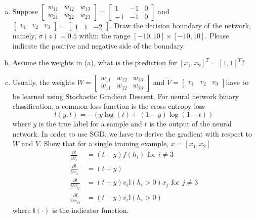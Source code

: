 \documentclass{article}
\begin{document}
    \begin{enumerate}[(a)]
        \item Suppose $\begin{bmatrix}w_{11} & w_{12} & w_{13} \\w_{21} & w_{22} & w_{23}\end{bmatrix} = \begin{bmatrix}1 & -1 & 0 \\-1 & -1 & 0\end{bmatrix}$ and $\begin{bmatrix} v_1 & v_2 & v_3\end{bmatrix} = \begin{bmatrix} 1 & 1 & -2\end{bmatrix}$. Draw the decision boundary of the network, namely, $\sigma(z) = 0.5$ within the range $[-10, 10] \times [-10, 10]$. Please indicate the positive and negative side of the boundary. 
        \item Assume the weights in (a), what is the prediction for $[x_1, x_2]^T = [1,1]^T$?
        \item Usually, the weights $W = \begin{bmatrix}w_{11} & w_{12} & w_{13} \\w_{11} & w_{12} & w_{13}\end{bmatrix}$ and $V = \begin{bmatrix} v_1 & v_2 & v_3\end{bmatrix}$have to be learned using Stochastic Gradient Descent. For neural network binary classification, a common loss function is the cross entropy loss
        $$l(y, t) = - (y \log (t) + (1 -y) \log (1-t))$$ where $y$ is the true label for a sample and $t$ is the output of the neural network. In order to use SGD, we have to derive the gradient with respect to $W$ and $V$. Show that for a single training example, $x = [x_1, x_2]$
        \begin{align*}
            \frac{\partial l}{\partial v_i} &= (t - y) f(h_i) \text{ for } i \neq 3 \\
            \frac{\partial l}{\partial v_3} &= (t - y) \\
            \frac{\partial l}{\partial w_{ij}} &= (t - y) v_i \mathbb{I}(h_i > 0) x_j \text{ for } j \neq 3\\
            \frac{\partial l}{\partial w_{i3}} &= (t - y) v_i \mathbb{I}(h_i > 0) 
        \end{align*}
        where $\mathbb{I}(\cdot)$ is the indicator function. 
    \end{enumerate}
\end{document}

